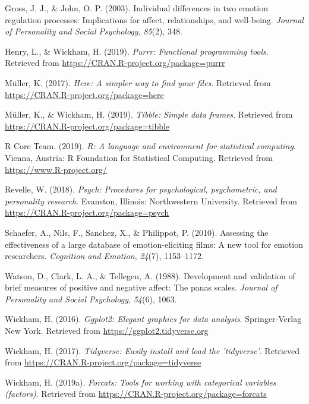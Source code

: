 \documentclass[man]{apa6}
\begin{document}
\hypertarget{ref-gross2003individual}{}
Gross, J. J., \& John, O. P. (2003). Individual differences in two
emotion regulation processes: Implications for affect, relationships,
and well-being. \emph{Journal of Personality and Social Psychology},
\emph{85}(2), 348.

\hypertarget{ref-R-purrr}{}
Henry, L., \& Wickham, H. (2019). \emph{Purrr: Functional programming
tools}. Retrieved from \url{https://CRAN.R-project.org/package=purrr}

\hypertarget{ref-R-here}{}
Müller, K. (2017). \emph{Here: A simpler way to find your files}.
Retrieved from \url{https://CRAN.R-project.org/package=here}

\hypertarget{ref-R-tibble}{}
Müller, K., \& Wickham, H. (2019). \emph{Tibble: Simple data frames}.
Retrieved from \url{https://CRAN.R-project.org/package=tibble}

\hypertarget{ref-R-base}{}
R Core Team. (2019). \emph{R: A language and environment for statistical
computing}. Vienna, Austria: R Foundation for Statistical Computing.
Retrieved from \url{https://www.R-project.org/}

\hypertarget{ref-R-psych}{}
Revelle, W. (2018). \emph{Psych: Procedures for psychological,
psychometric, and personality research}. Evanston, Illinois:
Northwestern University. Retrieved from
\url{https://CRAN.R-project.org/package=psych}

\hypertarget{ref-schaefer2010}{}
Schaefer, A., Nils, F., Sanchez, X., \& Philippot, P. (2010). Assessing
the effectiveness of a large database of emotion-eliciting films: A new
tool for emotion researchers. \emph{Cognition and Emotion},
\emph{24}(7), 1153--1172.

\hypertarget{ref-watson1988development}{}
Watson, D., Clark, L. A., \& Tellegen, A. (1988). Development and
validation of brief measures of positive and negative affect: The panas
scales. \emph{Journal of Personality and Social Psychology},
\emph{54}(6), 1063.

\hypertarget{ref-R-ggplot2}{}
Wickham, H. (2016). \emph{Ggplot2: Elegant graphics for data analysis}.
Springer-Verlag New York. Retrieved from
\url{https://ggplot2.tidyverse.org}

\hypertarget{ref-R-tidyverse}{}
Wickham, H. (2017). \emph{Tidyverse: Easily install and load the
'tidyverse'}. Retrieved from
\url{https://CRAN.R-project.org/package=tidyverse}

\hypertarget{ref-R-forcats}{}
Wickham, H. (2019a). \emph{Forcats: Tools for working with categorical
variables (factors)}. Retrieved from
\url{https://CRAN.R-project.org/package=forcats}
\end{document}
